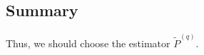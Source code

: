 \documentclass[a4paper]{article}
\begin{document}
%
%
%
%




\subsection{Summary}
Thus, we should choose the estimator $\widetilde{P}^{(q)}$.
\end{document}
